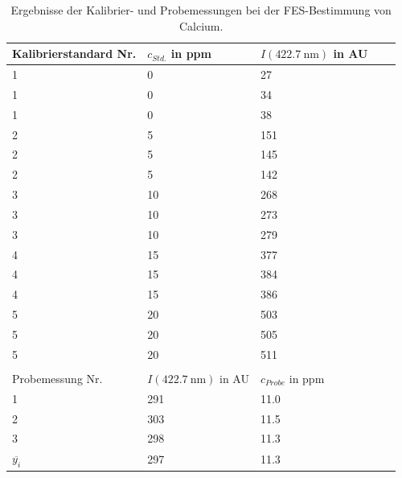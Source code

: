   \begin{table}[H]
    \centering
    \caption[Ergebnisse der FES-Bestimmung von Calcium, Quelle: Autor]{Ergebnisse der Kalibrier- und Probemessungen bei der FES-Bestimmung von Calcium.}
    
    \label{tab:ErgebnisseFES}
    \begin{tabular}{@{}ll|lp{4.5cm}l@{}}
      \toprule
      Kalibrierstandard Nr. & $c_{Std.}$ in \si{ppm} & $I\left(\SI[mode=text]{422.7}{\nano\meter}\right)$ in AU \\ \midrule
        1 & 0 & 27 \\
        1 & 0 & 34 \\
        1 & 0 & 38 \\
        2 & 5 & 151 \\
        2 & 5 & 145 \\
        2 & 5 & 142 \\
        3 & 10 & 268 \\
        3 & 10 & 273 \\
        3 & 10 & 279 \\
        4 & 15 & 377 \\
        4 & 15 & 384 \\
        4 & 15 & 386 \\
        5 & 20 & 503 \\
        5 & 20 & 505 \\
        5 & 20 & 511 \\ 
          &  &  \\
      \toprule
      Probemessung Nr. & $I\left(\SI[mode=text]{422.7}{\nano\meter}\right)$ in AU & $c_{Probe}$ in \si{ppm} \\ \midrule 
        1 & 291 & 11.0 \\
        2 & 303 & 11.5 \\ 
        3 & 298 & 11.3 \\ \midrule          
        $\overline{y_i}$ & 297 & 11.3 \\ \bottomrule
    \end{tabular}
  \end{table}
  
  
